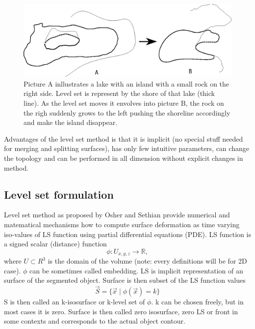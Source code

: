 \begin{enumerate}
\begin{figure}
    \centering
    \includegraphics[width=15cm]{data/shore.eps}
    \caption[Shore illustration of moving level set]{Picture A inllustrates a lake with an island with a small rock on the right side. Level set is represent by the shore of that lake (thick line). As the level set moves it envolves into picture B, the rock on the righ suddenly grows to the left pushing the shoreline accordingly and make the island disappear.}
    \label{fg:shore}
\end{figure}

Advantages of the level set method is that it is implicit (no special stuff needed for merging and splitting surfaces), has only few intuitive parameters, can change the topology and can be performed in all dimension without explicit changes in method. 

\end{enumerate}

\subsection{Level set formulation}

Level set method as proposed by Osher and Sethian \cite{sethianLS} provide numerical and matematical mechanisms how to compute surface deformation as time varying iso-values of LS function using partial differential equations (PDE). 
LS function is a signed scalar (distance) function 
\begin{equation}
\phi : U_{x,y,z} \rightarrow \mathbb R,
\end{equation}
where $U \subset R^3$ is the domain of the volume (note: every definitions will be for 2D case). $\phi$ can be sometimes called embedding. LS is implicit representation of an surface of the segmented object. Surface is then subset of the LS function values
\begin{equation}
\vec{S} = \{\vec{x}\mid \phi(\vec{x}) = k\}
\end{equation}
S is then called an k-isosurface or k-level set of $\phi$. k can be chosen freely, but in most cases it is zero. Surface is then called zero isosurface, zero LS or front in some contexts and corresponds to the actual object contour. 

